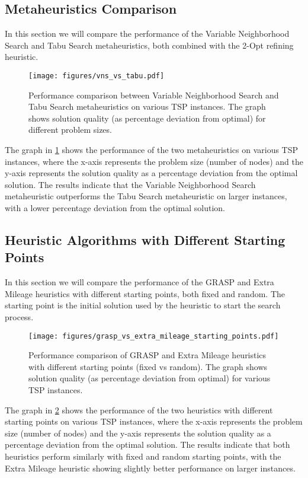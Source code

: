 \documentclass{article}
\begin{document}
\subsection{Metaheuristics Comparison}
In this section we will compare the performance of the Variable Neighborhood Search and Tabu Search metaheuristics, both combined with the 2-Opt refining heuristic.
\begin{figure}[ht]
	\centering
	\texttt{[image: figures/vns\_vs\_tabu.pdf]}
	\caption{Performance comparison between Variable Neighborhood Search and Tabu Search metaheuristics on various TSP instances. The graph shows solution quality (as percentage deviation from optimal) for different problem sizes.}
	\label{fig:vns_vs_tabu}
\end{figure}
The graph in \ref{fig:vns_vs_tabu} shows the performance of the two metaheuristics on various TSP instances, 
where the x-axis represents the problem size (number of nodes) and the y-axis represents the solution quality as a percentage deviation from the optimal solution.
The results indicate that the Variable Neighborhood Search metaheuristic outperforms the Tabu Search metaheuristic on larger instances,
with a lower percentage deviation from the optimal solution.
\subsection{Heuristic Algorithms with Different Starting Points}
In this section we will compare the performance of the GRASP and Extra Mileage heuristics with different starting points,
both fixed and random. The starting point is the initial solution used by the heuristic to start the search process.
\begin{figure}[ht]
	\centering
	\texttt{[image: figures/grasp\_vs\_extra\_mileage\_starting\_points.pdf]}
	\caption{Performance comparison of GRASP and Extra Mileage heuristics with different starting points (fixed vs random). The graph shows solution quality (as percentage deviation from optimal) for various TSP instances.}
	\label{fig:grasp_vs_extra_mileage_starting_points}
\end{figure}

The graph in \ref{fig:grasp_vs_extra_mileage_starting_points} shows the performance of the two heuristics with different starting points on various TSP instances, 
where the x-axis represents the problem size (number of nodes) and the y-axis represents the solution quality as a percentage deviation from the optimal solution.
The results indicate that both heuristics perform similarly with fixed and random starting points, with the Extra Mileage heuristic showing slightly better performance on larger instances.
\end{document}

